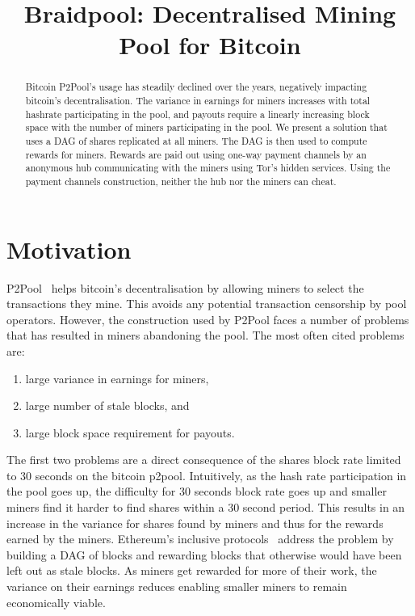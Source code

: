 \documentclass{article}
\title{Braidpool: Decentralised Mining Pool for Bitcoin}
\author{}
\date{}
\begin{document}
\maketitle

\begin{abstract}
  Bitcoin P2Pool's usage has steadily declined over the years,
  negatively impacting bitcoin's decentralisation. The variance in
  earnings for miners increases with total hashrate participating in
  the pool, and payouts require a linearly increasing block space with
  the number of miners participating in the pool. We present a
  solution that uses a DAG of shares replicated at all miners. The DAG
  is then used to compute rewards for miners. Rewards are paid out
  using one-way payment channels by an anonymous hub communicating
  with the miners using Tor's hidden services. Using the payment
  channels construction, neither the hub nor the miners can cheat.
\end{abstract}
   
\section{Motivation}

P2Pool~\cite{p2pool:wiki} helps bitcoin's decentralisation by allowing
miners to select the transactions they mine. This avoids any potential
transaction censorship by pool operators. However, the construction
used by P2Pool faces a number of problems that has resulted in miners
abandoning the pool. The most often cited problems are:

\begin{enumerate}
\item large variance in earnings for miners,
\item large number of stale blocks, and
\item large block space requirement for payouts.
\end{enumerate}

The first two problems are a direct consequence of the shares block
rate limited to 30 seconds on the bitcoin p2pool. Intuitively, as the
hash rate participation in the pool goes up, the difficulty for 30
seconds block rate goes up and smaller miners find it harder to find
shares within a 30 second period. This results in an increase in the
variance for shares found by miners and thus for the rewards earned by
the miners. Ethereum's inclusive protocols~\cite{inclusive-protocols}
address the problem by building a DAG of blocks and rewarding blocks
that otherwise would have been left out as stale blocks. As miners get
rewarded for more of their work, the variance on their earnings
reduces enabling smaller miners to remain economically viable.
\end{document}
